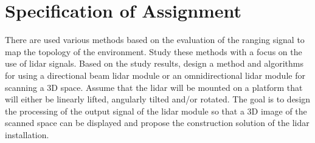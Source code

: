 \chapter{Specification of Assignment}
There are used various methods based on the evaluation of the ranging signal to map the topology of the
environment. Study these methods with a focus on the use of lidar signals. Based on the study results, design
a method and algorithms for using a directional beam lidar module or an omnidirectional lidar module for
scanning a 3D space. Assume that the lidar will be mounted on a platform that will either be linearly lifted,
angularly tilted and/or rotated. The goal is to design the processing of the output signal of the lidar module so
that a 3D image of the scanned space can be displayed and propose the construction solution of the lidar
installation.